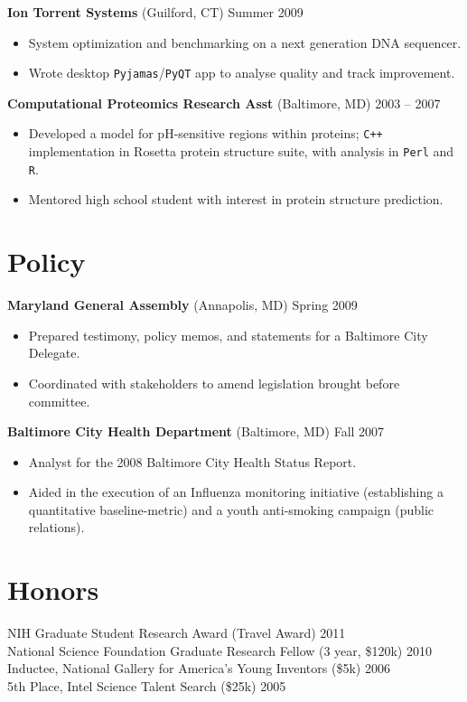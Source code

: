 \documentclass[margin]{res}
\newcommand{\locdatesubsection}[3]{\textbf{#1} (#2) \hfill #3}
\newcommand{\nblocdatesubsection}[3]{#1 (#2) \hfill #3 \\}
\begin{document}
\begin{sloppypar}
\begin{resume}
\locdatesubsection{Ion Torrent Systems}{Guilford, CT}{Summer 2009}
\begin{itemize}
\item System optimization and benchmarking on a next generation DNA sequencer.
\item Wrote desktop \texttt{Pyjamas}/\texttt{PyQT} app to analyse quality and track improvement.
\end{itemize}

\locdatesubsection{Computational Proteomics Research Asst}{Baltimore, MD}{2003 -- 2007}
\begin{itemize}
\item Developed a model for pH-sensitive regions within proteins; \texttt{C++} implementation in Rosetta protein structure suite, with analysis in \texttt{Perl} and \texttt{R}.
\item Mentored high school student with interest in protein structure prediction.
\end{itemize}

\section{Policy}
\locdatesubsection{Maryland General Assembly}{Annapolis, MD}{Spring 2009}
\begin{itemize}
\item Prepared testimony, policy memos, and statements for a Baltimore City Delegate.
\item Coordinated with stakeholders to amend legislation brought before committee.
\end{itemize}

\locdatesubsection{Baltimore City Health Department}{Baltimore, MD}{Fall 2007}
\begin{itemize}
\item Analyst for the 2008 Baltimore City Health Status Report. 
\item Aided in the execution of an Influenza monitoring initiative (establishing a quantitative baseline-metric) and a youth anti-smoking campaign (public relations).
\end{itemize}


\section{Honors}
\nblocdatesubsection{NIH Graduate Student Research Award}{Travel Award}{2011}
\nblocdatesubsection{National Science Foundation Graduate Research Fellow}{3 year, \$120k}{2010}
\nblocdatesubsection{Inductee, National Gallery for America's Young Inventors}{\$5k}{2006}
\nblocdatesubsection{5th Place, Intel Science Talent Search}{\$25k}{2005}


\end{resume}
\end{sloppypar}
\end{document}
